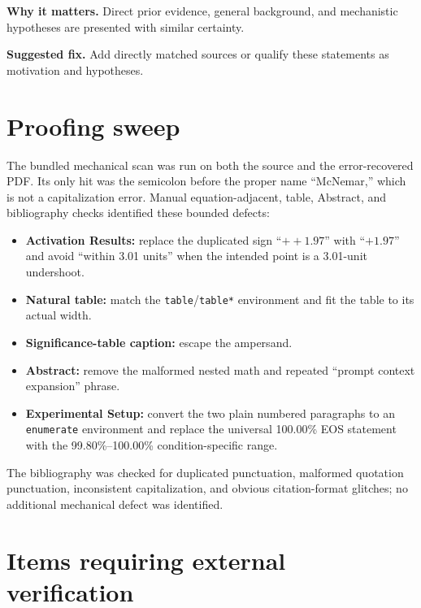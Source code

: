 \documentclass[11pt]{article}
\newcommand{\findinglabel}[1]{\textbf{#1}}
\begin{document}
\findinglabel{Why it matters.} Direct prior evidence, general background, and mechanistic hypotheses are presented with similar certainty.

\findinglabel{Suggested fix.} Add directly matched sources or qualify these statements as motivation and hypotheses.

\section*{Proofing sweep}

The bundled mechanical scan was run on both the source and the error-recovered PDF.  Its only hit was the semicolon before the proper name ``McNemar,'' which is not a capitalization error.  Manual equation-adjacent, table, Abstract, and bibliography checks identified these bounded defects:

\begin{itemize}
    \item \textbf{Activation Results:} replace the duplicated sign ``$++1.97$'' with ``$+1.97$'' and avoid ``within 3.01 units'' when the intended point is a 3.01-unit undershoot.
    \item \textbf{Natural table:} match the \texttt{table}/\texttt{table*} environment and fit the table to its actual width.
    \item \textbf{Significance-table caption:} escape the ampersand.
    \item \textbf{Abstract:} remove the malformed nested math and repeated ``prompt context expansion'' phrase.
    \item \textbf{Experimental Setup:} convert the two plain numbered paragraphs to an \texttt{enumerate} environment and replace the universal 100.00\% EOS statement with the 99.80\%--100.00\% condition-specific range.
\end{itemize}

The bibliography was checked for duplicated punctuation, malformed quotation punctuation, inconsistent capitalization, and obvious citation-format glitches; no additional mechanical defect was identified.

\section*{Items requiring external verification}
\end{document}

